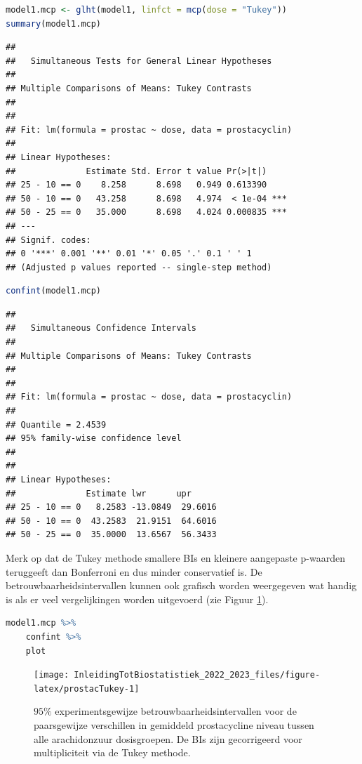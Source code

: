 \documentclass[
  12pt,dutch,coursenotes]{book}
\begin{document}
\begin{lstlisting}[language=R]
model1.mcp <- glht(model1, linfct = mcp(dose = "Tukey"))
summary(model1.mcp)
\end{lstlisting}

\begin{lstlisting}
## 
##   Simultaneous Tests for General Linear Hypotheses
## 
## Multiple Comparisons of Means: Tukey Contrasts
## 
## 
## Fit: lm(formula = prostac ~ dose, data = prostacyclin)
## 
## Linear Hypotheses:
##              Estimate Std. Error t value Pr(>|t|)    
## 25 - 10 == 0    8.258      8.698   0.949 0.613390    
## 50 - 10 == 0   43.258      8.698   4.974  < 1e-04 ***
## 50 - 25 == 0   35.000      8.698   4.024 0.000835 ***
## ---
## Signif. codes:  
## 0 '***' 0.001 '**' 0.01 '*' 0.05 '.' 0.1 ' ' 1
## (Adjusted p values reported -- single-step method)
\end{lstlisting}

\begin{lstlisting}[language=R]
confint(model1.mcp)
\end{lstlisting}

\begin{lstlisting}
## 
##   Simultaneous Confidence Intervals
## 
## Multiple Comparisons of Means: Tukey Contrasts
## 
## 
## Fit: lm(formula = prostac ~ dose, data = prostacyclin)
## 
## Quantile = 2.4539
## 95% family-wise confidence level
##  
## 
## Linear Hypotheses:
##              Estimate lwr      upr     
## 25 - 10 == 0   8.2583 -13.0849  29.6016
## 50 - 10 == 0  43.2583  21.9151  64.6016
## 50 - 25 == 0  35.0000  13.6567  56.3433
\end{lstlisting}

Merk op dat de Tukey methode smallere BIs en kleinere aangepaste p-waarden teruggeeft dan Bonferroni en dus minder conservatief is.
De betrouwbaarheidsintervallen kunnen ook grafisch worden weergegeven wat handig is als er veel vergelijkingen worden uitgevoerd (zie Figuur \ref{fig:prostacTukey}).

\begin{lstlisting}[language=R]
model1.mcp %>%
    confint %>%
    plot
\end{lstlisting}

\begin{figure}

{\centering \texttt{[image: InleidingTotBiostatistiek\_2022\_2023\_files/figure-latex/prostacTukey-1]} 

}

\caption{$95\%$ experimentsgewijze betrouwbaarheidsintervallen voor de paarsgewijze verschillen in gemiddeld prostacycline niveau tussen alle arachidonzuur dosisgroepen. De BIs zijn gecorrigeerd voor multipliciteit via de Tukey methode.}\label{fig:prostacTukey}
\end{figure}
\end{document}
